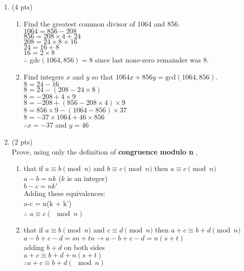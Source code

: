 \documentclass[12pt]{article}
\renewcommand{\a}{\ensuremath{\mathcal{A}}}
\begin{document}
\begin{enumerate}
\item (4 pts)
\begin{enumerate}
	\item  Find the greatest common divisor of 1064 and 856.
    \\$1064 = 856 - 208$
    \\$856 = 208 \times 4 +24$
    \\$208 = 24 \times 8 + 16$
    \\$24 = 16 + 8$
    \\$16 = 2 \times 8$
    \\$\therefore$ gdc$(1064,856)=8$ since last none-zero remainder was 8.
	\item  Find integers $x$ and $y$ so that $1064x+ 856y=\textrm{gcd}(1064,856).$
    \\$8 = 24 - 16$
    \\$8 = 24 - (208 - 24 \times 8)$
    \\$8 = -208 + 4 \times 9$
    \\$8 = -208 + (856 - 208 \times 4) \times 9$
    \\$8 = 856 \times 9 - (1064 - 856)\times 37$
    \\$8 = -37\times 1064 + 46\times 856$
    \\$\therefore x = -37$ and $y = 46$

\end{enumerate}

\item (2 pts) \\
Prove, using only the definition of {\bf  congruence modulo n },
\begin{enumerate}
	\item that if \(a \equiv b \pmod {n}\) and \(b \equiv c \pmod {n}\) then \(a \equiv c \pmod {n}\)
    \\$a - b = nk$ ($k$ is an integer)
    \\$b-c = nk'$
    \\Adding these equivalences:
    \\a-c = n(k + k')
    \\$\therefore$ $a \equiv c(\mod n)$
	\item that if \(a \equiv b \pmod {n}\) and \(c \equiv d \pmod {n}\) then \(a+c \equiv b+d \pmod {n}\)
    \\$a - b + c - d = sn + tn \rightarrow a - b + c - d = n(s + t)$
    \\adding $b+d$ on both sides
    \\$a+c\equiv b+d + n(s+t)$
    \\$\therefore a + c \equiv b + d (\mod n)$
\end{enumerate}

\end{enumerate}
\end{document}
